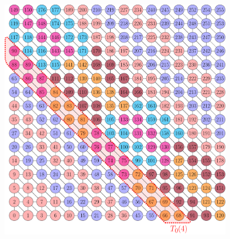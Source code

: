        \begin{figure}[H]
       	\begin{minipage}[c]{0.6\textwidth}
       		\includegraphics[height=0.3\textheight,width=0.89\textwidth]{pics/recursion/2d-7pt_example/2d-7pt/stencil_2d_7pt}
       	\end{minipage}\hfill
       	\begin{minipage}[c]{0.4\textwidth}

\end{minipage}
\end{figure}
